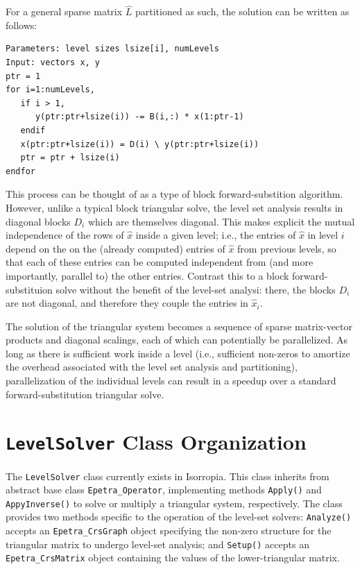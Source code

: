 \documentclass[12pt]{article}
\begin{document}
For a general sparse matrix $\hat{L}$ partitioned as such, the solution can be written as follows:
\begin{verbatim}
Parameters: level sizes lsize[i], numLevels
Input: vectors x, y
ptr = 1
for i=1:numLevels,
   if i > 1,
      y(ptr:ptr+lsize(i)) -= B(i,:) * x(1:ptr-1)
   endif
   x(ptr:ptr+lsize(i)) = D(i) \ y(ptr:ptr+lsize(i))
   ptr = ptr + lsize(i)
endfor
\end{verbatim}

This process can be thought of as a type of block forward-substition algorithm. However, unlike a typical block triangular solve, the level set analysis results in diagonal blocks $D_i$ which are themselves diagonal. This makes explicit the mutual independence of the rows of $\hat{x}$ inside a given level; i.e., the entries of $\hat{x}$ in level $i$ depend on the on the (already computed) entries of $\hat{x}$ from previous levels, so that each of these entries can be computed independent from (and more importantly, parallel to) the other entries. Contrast this to a block forward-substituion solve without the benefit of the level-set analysi: there, the blocks $D_i$ are not diagonal, and therefore they couple the entries in $\hat{x}_i$. 

The solution of the triangular system becomes a sequence of sparse matrix-vector products and diagonal scalings, each of which can potentially be parallelized. As long as there is sufficient work inside a level (i.e., sufficient non-zeros to amortize the overhead associated with the level set analysis and partitioning), parallelization of the individual levels can result in a speedup over a standard forward-substitution triangular solve.

\section{\texttt{LevelSolver} Class Organization}

The \texttt{LevelSolver} class currently exists in Isorropia. This class inherits from abstract base class \texttt{Epetra\_Operator}, implementing methods \texttt{Apply()} and \texttt{AppyInverse()} to solve or multiply a triangular system, respectively. The class provides two methods specific to the operation of the level-set solvers: \texttt{Analyze()} accepts an \texttt{Epetra\_CrsGraph} object specifying the non-zero structure for the triangular matrix to undergo level-set analysis; and \texttt{Setup()} accepts an \texttt{Epetra\_CrsMatrix} object containing the values of the lower-triangular matrix. 
\end{document}
